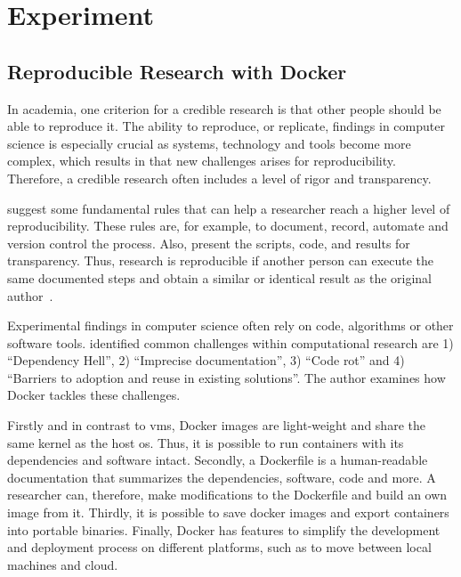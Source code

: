 \chapter{Experiment}\label{experiment}

\section{Reproducible Research with Docker}

In academia, one criterion for a credible research is that other people should be able to reproduce it.
The ability to reproduce, or replicate, findings in computer science is especially crucial as systems, technology and tools become more complex, which results in that new challenges arises for reproducibility.
Therefore, a credible research often includes a level of rigor and transparency.

\skippara \citet{sandve2013ten} suggest some fundamental rules that can help a researcher reach a higher level of reproducibility.
These rules are, for example, to document, record, automate and version control the process.
Also, present the scripts, code, and results for transparency.
Thus, research is reproducible if another person can execute the same documented steps and obtain a similar or identical result as the original author~\cite{piccolo2016tools, sandve2013ten}.

\skippara Experimental findings in computer science often rely on code, algorithms or other software tools.
\citet{boettiger2015introduction} identified common challenges within computational research are 1) ``Dependency Hell'', 2) ``Imprecise documentation'', 3) ``Code rot'' and 4) ``Barriers to adoption and reuse in existing solutions''.
The author examines how Docker tackles these challenges.

\skippara Firstly and in contrast to \gls{vm}s, Docker images are light-weight and share the same kernel as the host \gls{os}.
Thus, it is possible to run containers with its dependencies and software intact.
Secondly, a Dockerfile is a human-readable documentation that summarizes the dependencies, software, code and more.
A researcher can, therefore, make modifications to the Dockerfile and build an own image from it.
Thirdly, it is possible to save docker images and export containers into portable binaries.
Finally, Docker has features to simplify the development and deployment process on different platforms, such as to move between local machines and cloud.

%
%
\clearpage
